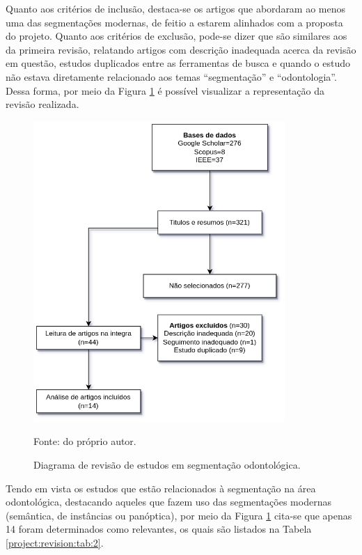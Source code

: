 Quanto aos critérios de inclusão, destaca-se os artigos que abordaram ao menos uma das segmentações modernas, de feitio a estarem alinhados com a proposta do projeto. Quanto aos critérios de exclusão, pode-se dizer que são similares aos da primeira revisão, relatando artigos com descrição inadequada acerca da revisão em questão, estudos duplicados entre as ferramentas de busca e quando o estudo não estava diretamente relacionado aos temas ``segmentação'' e ``odontologia''. Dessa forma, por meio da Figura \ref{project:revision:fig:2} é possível visualizar a representação da revisão realizada.

\begin{figure}[H]
    \centering
    \caption{Diagrama de revisão de estudos em segmentação odontológica.}
    \includegraphics[height=4.5in]{recursos/imagens/project/revisao_odonto.png}
    \label{project:revision:fig:2}


    Fonte: do próprio autor.
\end{figure}

Tendo em vista os estudos que estão relacionados à segmentação na área odontológica, destacando aqueles que fazem uso das segmentações modernas (semântica, de instâncias ou panóptica), por meio da Figura \ref{project:revision:fig:2} cita-se que apenas 14 foram determinados como relevantes, os quais são listados na Tabela \ref{project:revision:tab:2}.


